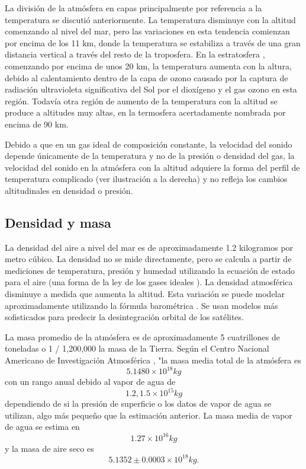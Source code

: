 \documentclass[12pt]{article}
\begin{document}
La división de la atmósfera en capas principalmente por referencia a la temperatura se discutió anteriormente. La temperatura disminuye con la altitud comenzando al nivel del mar, pero las variaciones en esta tendencia comienzan por encima de los 11 km, donde la temperatura se estabiliza a través de una gran distancia vertical a través del resto de la troposfera. En la estratosfera , comenzando por encima de unos 20 km, la temperatura aumenta con la altura, debido al calentamiento dentro de la capa de ozono causado por la captura de radiación ultravioleta significativa del Sol por el dioxígeno y el gas ozono en esta región. Todavía otra región de aumento de la temperatura con la altitud se produce a altitudes muy altas, en la termosfera acertadamente nombrada por encima de 90 km.

Debido a que en un gas ideal de composición constante, la velocidad del sonido depende únicamente de la temperatura y no de la presión o densidad del gas, la velocidad del sonido en la atmósfera con la altitud adquiere la forma del perfil de temperatura complicado (ver ilustración a la derecha) y no refleja los cambios altitudinales en densidad o presión.


\subsection{Densidad y masa}

La densidad del aire a nivel del mar es de aproximadamente 1.2 kilogramos por metro cúbico. La densidad no se mide directamente, pero se calcula a partir de mediciones de temperatura, presión y humedad utilizando la ecuación de estado para el aire (una forma de la ley de los gases ideales ). La densidad atmosférica disminuye a medida que aumenta la altitud. Esta variación se puede modelar aproximadamente utilizando la fórmula barométrica . Se usan modelos más sofisticados para predecir la desintegración orbital de los satélites.

La masa promedio de la atmósfera es de aproximadamente 5 cuatrillones de toneladas o 1 / 1,200,000 la masa de la Tierra. Según el Centro Nacional Americano de Investigación Atmosférica , "la masa media total de la atmósfera es \[5.1480 × 10^{18} kg \] con un rango anual debido al vapor de agua de \[
1.2, 1.5 × 10^{15} kg \] dependiendo de si la presión de superficie o los datos de vapor de agua se utilizan, algo más pequeño que la estimación anterior. La masa media de vapor de agua se estima en \[ 1.27 × 10^{16} kg \] y la masa de aire seco es \[ 5.1352 ± 0.0003 × 10^{18} kg. \]
\end{document}
